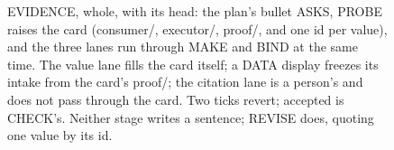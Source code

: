 \begin{figure}[t]
  \centering
  
  \caption{EVIDENCE, whole, with its head: the plan's bullet ASKS, PROBE raises
  the card (consumer/, executor/, proof/, and one id per value), and the three
  lanes run through MAKE and BIND at the same time. The value lane fills the
  card itself; a DATA display freezes its intake from the card's proof/; the
  citation lane is a person's and does not pass through the card. Two ticks
  revert; accepted is CHECK's. Neither stage writes a sentence; REVISE does,
  quoting one value by its id.}
  \label{fig:qpw00-evidence-logic}
\end{figure}
